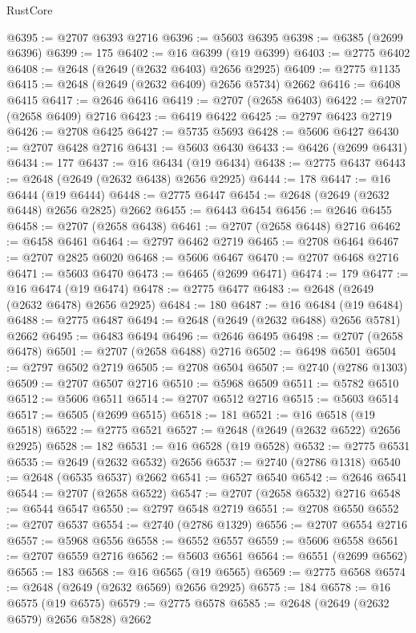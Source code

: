 \begin{lexlean}{RustCore}
\begin{coremodule}
@6395 := @2707 @6393 @2716
@6396 := @5603 @6395
@6398 := @6385 (@2699 @6396)
@6399 := 175
@6402 := @16 @6399 (@19 @6399)
@6403 := @2775 @6402
@6408 := @2648 (@2649 (@2632 @6403) @2656 @2925)
@6409 := @2775 @1135
@6415 := @2648 (@2649 (@2632 @6409) @2656 @5734) @2662
@6416 := @6408 @6415
@6417 := @2646 @6416
@6419 := @2707 (@2658 @6403)
@6422 := @2707 (@2658 @6409) @2716
@6423 := @6419 @6422
@6425 := @2797 @6423 @2719
@6426 := @2708 @6425
@6427 := @5735 @5693
@6428 := @5606 @6427
@6430 := @2707 @6428 @2716
@6431 := @5603 @6430
@6433 := @6426 (@2699 @6431)
@6434 := 177
@6437 := @16 @6434 (@19 @6434)
@6438 := @2775 @6437
@6443 := @2648 (@2649 (@2632 @6438) @2656 @2925)
@6444 := 178
@6447 := @16 @6444 (@19 @6444)
@6448 := @2775 @6447
@6454 := @2648 (@2649 (@2632 @6448) @2656 @2825) @2662
@6455 := @6443 @6454
@6456 := @2646 @6455
@6458 := @2707 (@2658 @6438)
@6461 := @2707 (@2658 @6448) @2716
@6462 := @6458 @6461
@6464 := @2797 @6462 @2719
@6465 := @2708 @6464
@6467 := @2707 @2825 @6020
@6468 := @5606 @6467
@6470 := @2707 @6468 @2716
@6471 := @5603 @6470
@6473 := @6465 (@2699 @6471)
@6474 := 179
@6477 := @16 @6474 (@19 @6474)
@6478 := @2775 @6477
@6483 := @2648 (@2649 (@2632 @6478) @2656 @2925)
@6484 := 180
@6487 := @16 @6484 (@19 @6484)
@6488 := @2775 @6487
@6494 := @2648 (@2649 (@2632 @6488) @2656 @5781) @2662
@6495 := @6483 @6494
@6496 := @2646 @6495
@6498 := @2707 (@2658 @6478)
@6501 := @2707 (@2658 @6488) @2716
@6502 := @6498 @6501
@6504 := @2797 @6502 @2719
@6505 := @2708 @6504
@6507 := @2740 (@2786 @1303)
@6509 := @2707 @6507 @2716
@6510 := @5968 @6509
@6511 := @5782 @6510
@6512 := @5606 @6511
@6514 := @2707 @6512 @2716
@6515 := @5603 @6514
@6517 := @6505 (@2699 @6515)
@6518 := 181
@6521 := @16 @6518 (@19 @6518)
@6522 := @2775 @6521
@6527 := @2648 (@2649 (@2632 @6522) @2656 @2925)
@6528 := 182
@6531 := @16 @6528 (@19 @6528)
@6532 := @2775 @6531
@6535 := @2649 (@2632 @6532) @2656
@6537 := @2740 (@2786 @1318)
@6540 := @2648 (@6535 @6537) @2662
@6541 := @6527 @6540
@6542 := @2646 @6541
@6544 := @2707 (@2658 @6522)
@6547 := @2707 (@2658 @6532) @2716
@6548 := @6544 @6547
@6550 := @2797 @6548 @2719
@6551 := @2708 @6550
@6552 := @2707 @6537
@6554 := @2740 (@2786 @1329)
@6556 := @2707 @6554 @2716
@6557 := @5968 @6556
@6558 := @6552 @6557
@6559 := @5606 @6558
@6561 := @2707 @6559 @2716
@6562 := @5603 @6561
@6564 := @6551 (@2699 @6562)
@6565 := 183
@6568 := @16 @6565 (@19 @6565)
@6569 := @2775 @6568
@6574 := @2648 (@2649 (@2632 @6569) @2656 @2925)
@6575 := 184
@6578 := @16 @6575 (@19 @6575)
@6579 := @2775 @6578
@6585 := @2648 (@2649 (@2632 @6579) @2656 @5828) @2662

\end{coremodule}
\end{lexlean}
